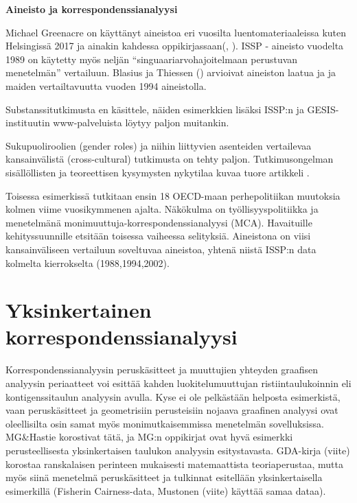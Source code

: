 \documentclass[
  finnish,
]{book}
\begin{document}
\textbf{Aineisto ja korrespondenssianalyysi}

Michael Greenacre on käyttänyt aineistoa eri vuosilta luentomateriaaleissa kuten
Helsingissä 2017\citep{RefWorks:doc:5b6ef091e4b0984fd9b8c0ca} ja ainakin kahdessa
oppikirjassaan(\citep{RefWorks:doc:5a857a43e4b0ed2d44664d7c},
\citep{RefWorks:doc:5a857a43e4b0ed2d44664d78}).
ISSP - aineisto vuodelta 1989 on käytetty myös neljän ``singuaariarvohajoitelmaan
perustuvan menetelmän'' vertailuun\citep{RefWorks:doc:5b6f159ce4b0bc0f31734b76}. Blasius
ja Thiessen (\citep{RefWorks:doc:5b15542ee4b0e2616bc42dca}) arvioivat aineiston laatua
ja ja maiden vertailtavuutta vuoden 1994 aineistolla.

Substanssitutkimusta en käsittele, näiden esimerkkien lisäksi ISSP:n ja
GESIS-instituutin www-palveluista löytyy paljon muitankin.

Sukupuoliroolien (gender roles) ja niihin liittyvien asenteiden vertailevaa
kansainvälistä (cross-cultural) tutkimusta on tehty paljon. Tutkimusongelman
sisällöllisten ja teoreettisen kysymysten nykytilaa kuvaa tuore artikkeli
\citep{RefWorks:doc:5bd08fb6e4b05c5447c9a9f9}.

Toisessa esimerkissä \citep{RefWorks:doc:5bd0a663e4b0c91dcf7c4be9} tutkitaan ensin 18
OECD-maan perhepolitiikan muutoksia kolmen viime vuosikymmenen ajalta. Näkökulma on
työllisyyspolitiikka ja menetelmänä monimuuttuja-korrespondenssianalyysi (MCA).
Havaituille kehityssuunnille etsitään toisessa vaiheessa selityksiä. Aineistona
on viisi kansainväliseen vertailuun soveltuvaa aineistoa, yhtenä niistä ISSP:n
data kolmelta kierrokselta (1988,1994,2002).

\hypertarget{yksinkertainen-korrespondenssianalyysi}{%
\chapter{Yksinkertainen korrespondenssianalyysi}\label{yksinkertainen-korrespondenssianalyysi}}

Korrespondenssianalyysin peruskäsitteet ja muuttujien yhteyden graafisen analyysin
periaatteet voi esittää kahden luokitelumuuttujan ristiintaulukoinnin eli
kontigenssitaulun analyysin avulla. Kyse ei ole pelkästään helposta esimerkistä,
vaan peruskäsitteet ja geometrisiin perusteisiin nojaava graafinen analyysi ovat
oleellisilta osin samat myös monimutkaisemmissa menetelmän sovelluksissa.
MG\&Hastie korostivat tätä, ja MG:n oppikirjat ovat hyvä esimerkki perusteellisesta
yksinkertaisen taulukon analyysin esitystavasta. GDA-kirja (viite) korostaa
ranskalaisen perinteen mukaisesti matemaattista teoriaperustaa, mutta myös siinä
menetelmä peruskäsitteet ja tulkinnat esitellään yksinkertaisella esimerkillä
(Fisherin Cairness-data, Mustonen (viite) käyttää samaa dataa).
\end{document}
